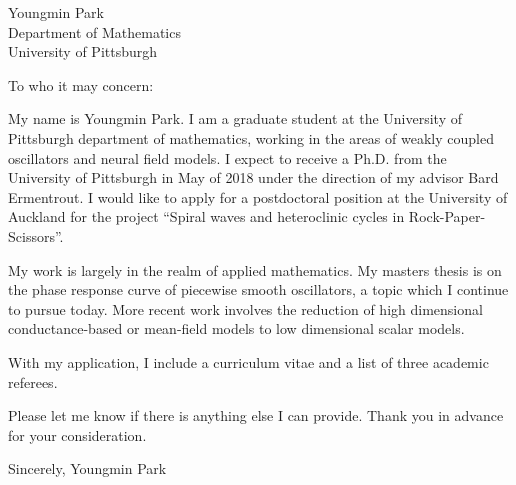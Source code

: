 \documentclass[a4paper,11pt]{letter}
\begin{document}
\begin{letter}{Youngmin Park \\ Department of Mathematics\\ University of Pittsburgh}

\opening{To who it may concern:}

My name is Youngmin Park. I am a graduate student at the University of Pittsburgh department of mathematics, working in the areas of weakly coupled oscillators and neural field models. I expect to receive a Ph.D. from the University of Pittsburgh in May of 2018 under the direction of my advisor Bard Ermentrout. I would like to apply for a postdoctoral position at the University of Auckland for the project ``Spiral waves and heteroclinic cycles in Rock-Paper-Scissors''.

My work is largely in the realm of applied mathematics. My masters thesis is on the phase response curve of piecewise smooth oscillators, a topic which I continue to pursue today. More recent work involves the reduction of high dimensional conductance-based or mean-field models to low dimensional scalar models.

With my application, I include a curriculum vitae and a list of three academic referees.

Please let me know if there is anything else I can provide. Thank you in advance for your consideration.

Sincerely,
Youngmin Park
 
 
 
\end{letter}
\end{document}
